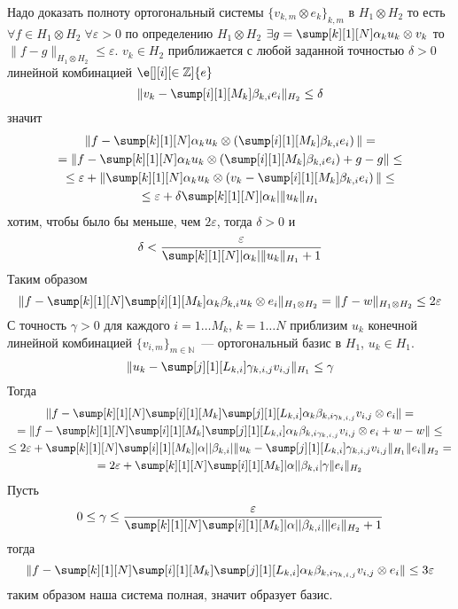 \documentclass[14pt]{extarticle}
\begin{document}
\begin{Proof}
    Надо доказать полноту ортогональный системы $\{v_{k, m} \otimes e_k\}_{k, m}$ в 
    $H_1 \otimes H_2$ то есть $\forall f \in H_1 \otimes H_2\; \forall \varepsilon > 0$ по
    определению $H_1 \otimes H_2$ $\exists g = \sump[k][1][N] \alpha_k u_k \otimes v_k$
    то $\|f -g\|_{H_1 \otimes H_2} \le \varepsilon$.
    $v_k \in H_2$  приближается с любой заданной точностью $\delta > 0$ линейной
    комбинацией $\e[][i][\in \mathbb Z]{e}$
    $$
    \|v_k - \sump[i][1][M_k] \beta_{k,i} e_i\|_{H_2} \le \delta
    $$
    значит
    \begin{multline*}
        \|f - \sump[k][1][N]\alpha_k u_k \otimes \left(\sump[i][1][M_k]\beta_{k,i} e_i\right)\| =\\=
        \|f - \sump[k][1][N]\alpha_k u_k \otimes \left(\sump[i][1][M_k]\beta_{k,i} e_i\right) +g - g\|
        \le\\\le \varepsilon + \|\sump[k][1][N]\alpha_k u_k \otimes \left(v_k - \sump[i][1][M_k]
        \beta_{k,i} e_i\right)\| \le\\\le
        \varepsilon + \delta \sump[k][1][N]|\alpha_k|\|u_k\|_{H_1}
    \end{multline*}
    хотим, чтобы было бы меньше, чем $2 \varepsilon$, тогда $\delta > 0$ и
    $$
    \delta < \dfrac{\varepsilon}{\sump[k][1][N] |\alpha_k|\|u_k\|_{H_1} + 1}
    $$
    Таким образом
    $$
    \|f - \sump[k][1][N]\sump[i][1][M_k]\alpha_k \beta_{k, i} u_k \otimes e_i\|_{H_1 \otimes H_2}
    = \|f - w\|_{H_1 \otimes H_2}
    \le 2\varepsilon
    $$
    С точность $\gamma > 0$ для каждого $i = 1 \dots M_k$, $k = 1 \dots N$ приблизим $u_k$
    конечной линейной комбинацией $\{v_{i, m}\}_{m \in \mathbb N}$~--- ортогональный 
    базис в $H_1$, $u_k \in H_1$.
    $$
    \|u_k - \sump[j][1][L_{k, i}]\gamma_{k, i, j} v_{i, j}\|_{H_1} \le \gamma
    $$
    Тогда
    \begin{multline*}
        \|f - \sump[k][1][N]\sump[i][1][M_k]\sump[j][1][L_{k, i}] \alpha_k \beta_{k, i \gamma_{k, i, j}}
        v_{i, j} \otimes e_i\| =\\=
        \|f - \sump[k][1][N]\sump[i][1][M_k]\sump[j][1][L_{k, i}] \alpha_k \beta_{k, i \gamma_{k, i, j}}
        v_{i, j} \otimes e_i + w - w\| \le\\\le
        2 \varepsilon + \sump[k][1][N]\sump[i][1][M_k]|\alpha||\beta_{k, i}|\|u_k - \sump[j][1][
        L_{k,i }] \gamma_{k, i, j} v_{i, j}\|_{H_1} \|e_i\|_{H_2} =\\=
        2\varepsilon + \sump[k][1][N]\sump[i][1][M_k]|\alpha||\beta_{k, i}| \gamma \|e_i\|_{H_2}
    \end{multline*}
    Пусть
    $$
    0 \le \gamma \le \dfrac{\varepsilon}{\sump[k][1][N]\sump[i][1][M_k]|\alpha||\beta_{k, i}|\|e_i
    \|_{H_2} + 1}
    $$
    тогда
    $$
    \|f - \sump[k][1][N]\sump[i][1][M_k]\sump[j][1][L_{k, i}] \alpha_k \beta_{k, i \gamma_{k, i, j}}
    v_{i, j} \otimes e_i\| \le 3 \varepsilon
    $$
    таким образом наша система полная, значит образует базис.
\end{Proof}
\end{document}
